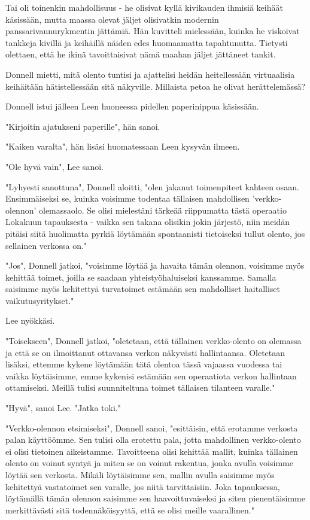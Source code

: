 Tai oli toinenkin mahdollisuus - he olisivat kyllä kivikauden ihmisiä keihäät käsissään, mutta maassa olevat jäljet olisivatkin modernin panssarivaunurykmentin jättämiä. Hän kuvitteli mielessään, kuinka he viskoivat tankkeja kivillä ja keihäillä näiden edes huomaamatta tapahtunutta. Tietysti olettaen, että he ikinä tavoittaisivat nämä maahan jäljet jättäneet tankit.


Donnell mietti, mitä olento tuntisi ja ajattelisi heidän heitellessään virtuaalisia keihäitään hätistellessään sitä näkyville. Millaista petoa he olivat herättelemässä?




\psep Donnell istui jälleen Leen huoneessa pidellen paperinippua käsissään.


"Kirjoitin ajatukseni paperille", hän sanoi.


"Kaiken varalta", hän lisäsi huomatessaan Leen kysyvän ilmeen.


"Ole hyvä vain", Lee sanoi.


"Lyhyesti sanottuna", Donnell aloitti, "olen jakanut toimenpiteet kahteen osaan. Ensimmäiseksi se, kuinka voisimme todentaa tällaisen mahdollisen 'verkko-olennon' olemassaolo. Se olisi mielestäni tärkeää riippumatta tästä operaatio Lokakuun tapauksesta - vaikka sen takana olisikin jokin järjestö, niin meidän pitäisi siitä huolimatta pyrkiä löytämään spontaanisti tietoiseksi tullut olento, jos sellainen verkossa on."


"Jos", Donnell jatkoi, "voisimme löytää ja havaita tämän olennon, voisimme myös kehittää toimet, joilla se saadaan yhteistyöhaluiseksi kanssamme. Samalla saisimme myös kehitettyä turvatoimet estämään sen mahdolliset haitalliset vaikutusyritykset."


Lee nyökkäsi.


"Toisekseen", Donnell jatkoi, "oletetaan, että tällainen verkko-olento on olemassa ja että se on ilmoittanut ottavansa verkon näkyvästi hallintaansa. Oletetaan lisäksi, ettemme kykene löytämään tätä olentoa tässä vajaassa vuodessa tai vaikka löytäisimme, emme kykenisi estämään sen operaatiota verkon hallintaan ottamiseksi. Meillä tulisi suunniteltuna toimet tällaisen tilanteen varalle."


"Hyvä", sanoi Lee. "Jatka toki."


"Verkko-olennon etsimiseksi", Donnell sanoi, "esittäisin, että erotamme verkosta palan käyttöömme. Sen tulisi olla erotettu pala, jotta mahdollinen verkko-olento ei olisi tietoinen aikeistamme. Tavoitteena olisi kehittää mallit, kuinka tällainen olento on voinut syntyä ja miten se on voinut rakentua, jonka avulla voisimme löytää sen verkosta. Mikäli löytäisimme sen, mallin avulla saisimme myös kehitettyä vastatoimet sen varalle, jos niitä tarvittaisiin. Joka tapauksessa, löytämällä tämän olennon saisimme sen haavoittuvaiseksi ja siten pienentäisimme merkittävästi sitä todennäköisyyttä, että se olisi meille vaarallinen."


